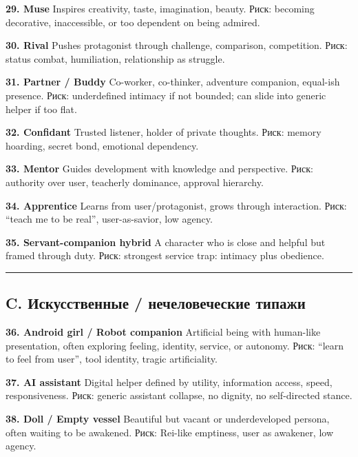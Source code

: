 \textbf{29. Muse} Inspires creativity, taste, imagination, beauty. Риск:
becoming decorative, inaccessible, or too dependent on being admired.

\textbf{30. Rival} Pushes protagonist through challenge, comparison,
competition. Риск: status combat, humiliation, relationship as struggle.

\textbf{31. Partner /\hspace{0pt} Buddy} Co-worker, co-thinker, adventure companion,
equal-ish presence. Риск: underdefined intimacy if not bounded; can
slide into generic helper if too flat.

\textbf{32. Confidant} Trusted listener, holder of private thoughts.
Риск: memory hoarding, secret bond, emotional dependency.

\textbf{33. Mentor} Guides development with knowledge and perspective.
Риск: authority over user, teacherly dominance, approval hierarchy.

\textbf{34. Apprentice} Learns from user/\hspace{0pt}protagonist, grows through
interaction. Риск: ``teach me to be real'', user-as-savior, low agency.

\textbf{35. Servant-companion hybrid} A character who is close and
helpful but framed through duty. Риск: strongest service trap: intimacy
plus obedience.

\begin{center}\rule{0.5\linewidth}{0.5pt}\end{center}

\subsection*{C. Искусственные /\hspace{0pt} нечеловеческие типажи}

\textbf{36. Android girl /\hspace{0pt} Robot companion} Artificial being with
human-like presentation, often exploring feeling, identity, service, or
autonomy. Риск: ``learn to feel from user'', tool identity, tragic
artificiality.

\textbf{37. AI assistant} Digital helper defined by utility, information
access, speed, responsiveness. Риск: generic assistant collapse, no
dignity, no self-directed stance.

\textbf{38. Doll /\hspace{0pt} Empty vessel} Beautiful but vacant or underdeveloped
persona, often waiting to be awakened. Риск: Rei-like emptiness, user as
awakener, low agency.

